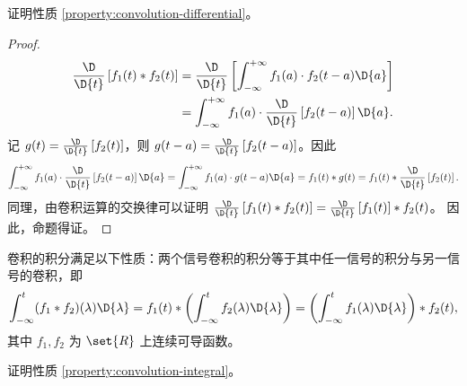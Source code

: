 \begin{homework}
    证明性质 \ref{property:convolution-differential}。
\end{homework}

\begin{proof}
    \begin{align*}
        \frac{\D}{\D{t}}\left[f_1(t) * f_2(t)\right]
        & = \frac{\D}{\D{t}}\left[\int_{-\infty}^{+\infty}f_1(a) \cdot f_2(t - a)\D{a}\right] \\
        & = \int_{-\infty}^{+\infty}f_1(a) \cdot \frac{\D}{\D{t}}\left[f_2(t - a)\right]\D{a}.
    \end{align*}
    记 $g(t) = \frac{\D}{\D{t}}\left[f_2(t)\right]$，则 $g(t - a) = \frac{\D}{\D{t}}\left[f_2(t - a)\right]$。因此
    \begin{align*}
        \int_{-\infty}^{+\infty}f_1(a) \cdot \frac{\D}{\D{t}}\left[f_2(t - a)\right]\D{a}
        = \int_{-\infty}^{+\infty}f_1(a) \cdot g(t - a)\D{a}
        = f_1(t) * g(t)
        = f_1(t) * \frac{\D}{\D{t}}\left[f_2(t)\right].
    \end{align*}
    同理，由卷积运算的交换律可以证明 $\frac{\D}{\D{t}}\left[f_1(t) * f_2(t)\right] = \frac{\D}{\D{t}}\left[f_1(t)\right] * f_2(t)$。
    因此，命题得证。
\end{proof}

\begin{property}[卷积的积分性质]
    \label{property:convolution-integral}
    卷积的积分满足以下性质：两个信号卷积的积分等于其中任一信号的积分与另一信号的卷积，即
    \begin{align*}
        \int_{-\infty}^{t}(f_1 * f_2)(\lambda)\D{\lambda}
        = f_1(t) * \left(\int_{-\infty}^{t}f_2(\lambda)\D{\lambda}\right)
        = \left(\int_{-\infty}^{t}f_1(\lambda)\D{\lambda}\right) * f_2(t),
    \end{align*}
    其中 $f_1, f_2$ 为  $\set{R}$ 上连续可导函数。
\end{property}

\begin{homework}
    证明性质 \ref{property:convolution-integral}。
\end{homework}

